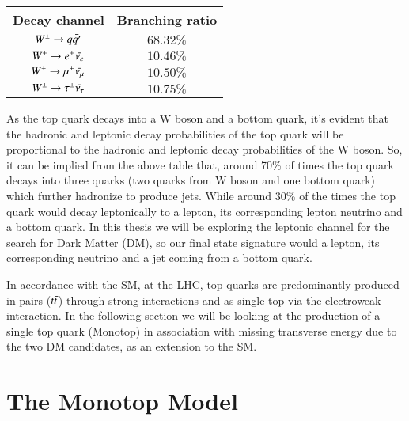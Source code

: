 \begin{table}[h!]
  \centering
  \caption{}
  \label{tab:average_channels}
  \begin{tabular}{cc}
    \toprule
     Decay channel &  Branching ratio \\
     \midrule
      $W^{\pm} \rightarrow q\Bar{q'}$ &   $68.32\%$  \\
      $W^{\pm} \rightarrow e^{\pm} \Bar{\nu_{e}}$ &   $10.46\%$  \\
      $W^{\pm} \rightarrow \mu^{\pm} \Bar{\nu_{\mu}}$ &   $10.50\%$  \\
      $W^{\pm} \rightarrow \tau^{\pm} \Bar{\nu_{\tau}}$ &   $10.75\%$  \\
      \bottomrule
  \end{tabular}
\end{table}

As the top quark decays into a W boson and a bottom quark, it's evident that the hadronic and leptonic decay probabilities of the top quark will be proportional to the hadronic and leptonic decay probabilities of the W boson. So, it can be implied from the above table that, around 70\% of times the top quark decays into three quarks (two quarks from W boson and one bottom quark) which further hadronize to produce jets. While around 30\% of the times the top quark would decay leptonically to a lepton, its corresponding lepton neutrino and a bottom quark. In this thesis we will be exploring the leptonic channel for the search for Dark Matter (DM), so our final state signature would a lepton, its corresponding neutrino and a jet coming from a bottom quark.

In accordance with the SM, at the LHC, top quarks are predominantly produced in pairs ($t \Bar{t}$) through strong interactions and as single top via the electroweak interaction. In the following section we will be looking at the production of a single top quark (Monotop) in association with missing transverse energy due to the two DM candidates, as an extension to the SM. 


\section{The Monotop Model}